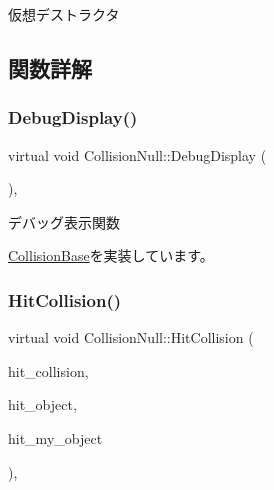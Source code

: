 仮想デストラクタ 



\subsection{関数詳解}
\mbox{\label{class_collision_null_a3ee0dacfb13c949538519f39d2f6fb0f}} 
\subsubsection{\texorpdfstring{Debug\+Display()}{DebugDisplay()}}
{\footnotesize\ttfamily virtual void Collision\+Null\+::\+Debug\+Display (\begin{DoxyParamCaption}{ }\end{DoxyParamCaption})\hspace{0.3cm}{\ttfamily [inline]}, {\ttfamily [virtual]}}



デバッグ表示関数 



\mbox{\hyperlink{class_collision_base_a0b2c1e3b090431d596b6a17e81360932}{Collision\+Base}}を実装しています。

\mbox{\label{class_collision_null_a580f507d8918865679feec3cc7b613d1}} 
\subsubsection{\texorpdfstring{Hit\+Collision()}{HitCollision()}}
{\footnotesize\ttfamily virtual void Collision\+Null\+::\+Hit\+Collision (\begin{DoxyParamCaption}\item[{\mbox{\hyperlink{class_collision_base}{Collision\+Base}} $\ast$}]{hit\+\_\+collision,  }\item[{\mbox{\hyperlink{class_collision_object}{Collision\+Object}} $\ast$}]{hit\+\_\+object,  }\item[{\mbox{\hyperlink{class_collision_object}{Collision\+Object}} $\ast$}]{hit\+\_\+my\+\_\+object }\end{DoxyParamCaption})\hspace{0.3cm}{\ttfamily [inline]}, {\ttfamily [virtual]}}



